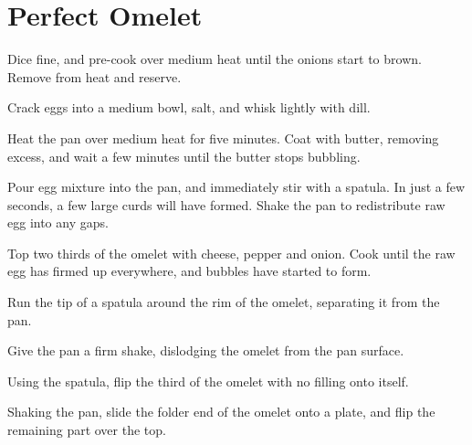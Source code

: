 
\section{Perfect Omelet}
\begin{recipe}


\columnbreak


Dice fine, and pre-cook over medium heat until the onions start to brown. Remove from heat and reserve.


Crack eggs into a medium bowl, salt, and whisk lightly with dill.


Heat the pan over medium heat for five minutes. Coat with butter, removing excess, and wait a few minutes until the butter stops bubbling.

Pour egg mixture into the pan, and immediately stir with a spatula. In just a few seconds, a few large curds will have formed. Shake the pan to redistribute raw egg into any gaps.


Top two thirds of the omelet with cheese, pepper and onion. Cook until the raw egg has firmed up everywhere, and bubbles have started to form.

Run the tip of a spatula around the rim of the omelet, separating it from the pan.

Give the pan a firm shake, dislodging the omelet from the pan surface.

Using the spatula, flip the third of the omelet with no filling onto itself.

Shaking the pan, slide the folder end of the omelet onto a plate, and flip the remaining part over the top.

\end{recipe}


